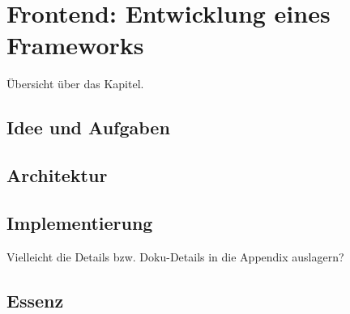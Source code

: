 \chapter{Frontend: Entwicklung eines Frameworks}

Übersicht über das Kapitel.

\section{Idee und Aufgaben}

\section{Architektur}

\section{Implementierung}

Vielleicht die Details bzw. Doku-Details in die Appendix auslagern?

\section{Essenz}


